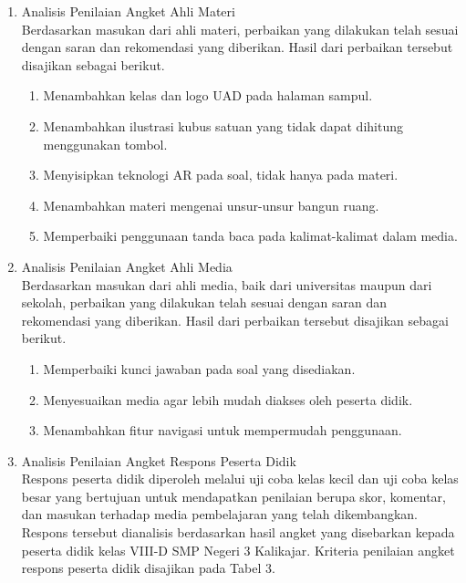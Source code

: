 \documentclass[12pt]{article}
\begin{document}
\begin{enumerate}
    \item Analisis Penilaian Angket Ahli Materi\\
    \hspace*{1cm}Berdasarkan masukan dari ahli materi, perbaikan yang dilakukan telah sesuai dengan saran dan rekomendasi yang diberikan. Hasil dari perbaikan tersebut disajikan sebagai berikut.
    \begin{enumerate}
        \item Menambahkan kelas dan logo UAD pada halaman sampul.
        \item Menambahkan ilustrasi kubus satuan yang tidak dapat dihitung menggunakan tombol.
        \item Menyisipkan teknologi AR pada soal, tidak hanya pada materi.
        \item Menambahkan materi mengenai unsur-unsur bangun ruang.
        \item Memperbaiki penggunaan tanda baca pada kalimat-kalimat dalam media.
    \end{enumerate}
    \item Analisis Penilaian Angket Ahli Media\\
    \hspace*{1cm}Berdasarkan masukan dari ahli media, baik dari universitas maupun dari sekolah, perbaikan yang dilakukan telah sesuai dengan saran dan rekomendasi yang diberikan. Hasil dari perbaikan tersebut disajikan sebagai berikut.
    \begin{enumerate}
        \item Memperbaiki kunci jawaban pada soal yang disediakan.
        \item Menyesuaikan media agar lebih mudah diakses oleh peserta didik.
        \item Menambahkan fitur navigasi untuk mempermudah penggunaan.
    \end{enumerate}
    \item Analisis Penilaian Angket Respons Peserta Didik\\
    \hspace*{1cm}Respons peserta didik diperoleh melalui uji coba kelas kecil dan uji coba kelas besar yang bertujuan untuk mendapatkan penilaian berupa skor, komentar, dan masukan terhadap media pembelajaran yang telah dikembangkan. Respons tersebut dianalisis berdasarkan hasil angket yang disebarkan kepada peserta didik kelas VIII-D SMP Negeri 3 Kalikajar. Kriteria penilaian angket respons peserta didik disajikan pada Tabel 3.

\end{enumerate}
\end{document}
